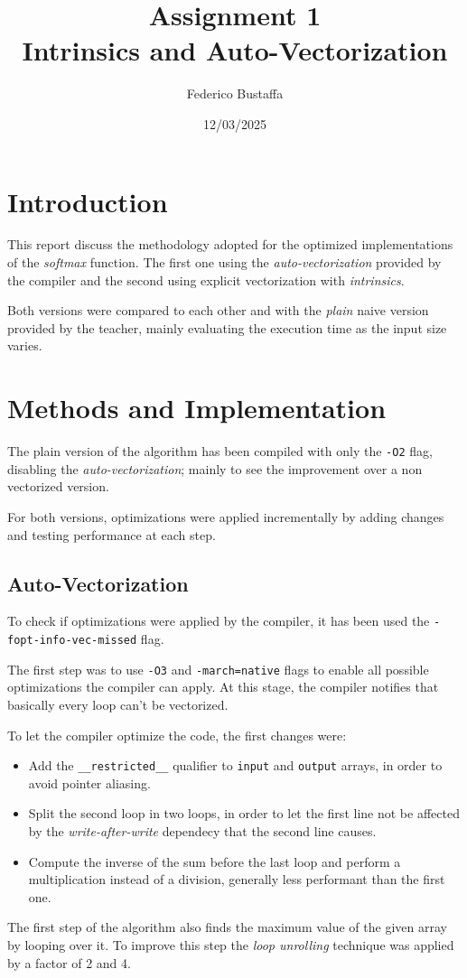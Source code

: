 \documentclass[12pt, a4paper]{article}
\title{Assignment 1\\Intrinsics and Auto-Vectorization}
\author{Federico Bustaffa}
\date{12/03/2025}
\begin{document}
\maketitle
\tableofcontents

\section{Introduction}

This report discuss the methodology adopted for the optimized implementations
of the \textit{softmax} function. The first one using the \textit{auto-vectorization}
provided by the compiler and the second using explicit vectorization with
\textit{intrinsics}.

Both versions were compared to each other and with the \textit{plain} naive
version provided by the teacher, mainly evaluating the execution time as the
input size varies.

\section{Methods and Implementation}

The plain version of the algorithm has been compiled with only the \verb|-O2|
flag, disabling the \textit{auto-vectorization}; mainly to see the improvement
over a non vectorized version.

For both versions, optimizations were applied incrementally by adding changes
and testing performance at each step.

\subsection{Auto-Vectorization}

To check if optimizations were applied by the compiler, it has been used the
\verb|-fopt-info-vec-missed| flag.

The first step was to use \verb|-O3| and \verb|-march=native| flags to enable
all possible optimizations the compiler can apply. At this stage, the compiler
notifies that basically every loop can't be vectorized.

To let the compiler optimize the code, the first changes were:
\begin{itemize}
	\item Add the \verb|__restricted__| qualifier to \verb|input| and
	      \verb|output| arrays, in order to avoid pointer aliasing.
	\item Split the second loop in two loops, in order to let the first line
	      not be affected by the \textit{write-after-write} dependecy that the
	      second line causes.
	\item Compute the inverse of the sum before the last loop and perform a
	      multiplication instead of a division, generally less performant than
	      the first one.
\end{itemize}
The first step of the algorithm also finds the maximum value of the given array
by looping over it. To improve this step the \textit{loop unrolling} technique
was applied by a factor of 2 and 4.
\end{document}
